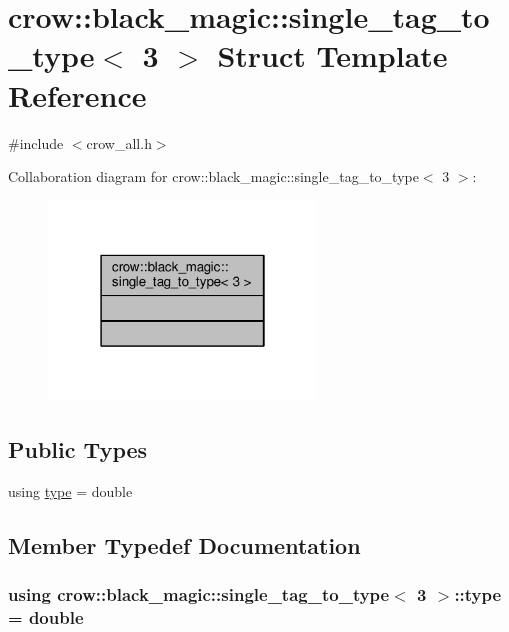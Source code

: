 \hypertarget{structcrow_1_1black__magic_1_1single__tag__to__type_3_013_01_4}{\section{crow\-:\-:black\-\_\-magic\-:\-:single\-\_\-tag\-\_\-to\-\_\-type$<$ 3 $>$ Struct Template Reference}
\label{structcrow_1_1black__magic_1_1single__tag__to__type_3_013_01_4}
}


{\ttfamily \#include $<$crow\-\_\-all.\-h$>$}



Collaboration diagram for crow\-:\-:black\-\_\-magic\-:\-:single\-\_\-tag\-\_\-to\-\_\-type$<$ 3 $>$\-:
\nopagebreak
\begin{figure}[H]
\begin{center}
\leavevmode
\includegraphics[width=202pt]{structcrow_1_1black__magic_1_1single__tag__to__type_3_013_01_4__coll__graph}
\end{center}
\end{figure}
\subsection*{Public Types}
\begin{DoxyCompactItemize}
\item 
using \hyperlink{structcrow_1_1black__magic_1_1single__tag__to__type_3_013_01_4_acb7925b6aa7481f3fcf056b218d9b9ee}{type} = double
\end{DoxyCompactItemize}


\subsection{Member Typedef Documentation}
\hypertarget{structcrow_1_1black__magic_1_1single__tag__to__type_3_013_01_4_acb7925b6aa7481f3fcf056b218d9b9ee}{
\subsubsection[{type}]{\setlength{\rightskip}{0pt plus 5cm}using {\bf crow\-::black\-\_\-magic\-::single\-\_\-tag\-\_\-to\-\_\-type}$<$ 3 $>$\-::{\bf type} =  double}}\label{structcrow_1_1black__magic_1_1single__tag__to__type_3_013_01_4_acb7925b6aa7481f3fcf056b218d9b9ee}


